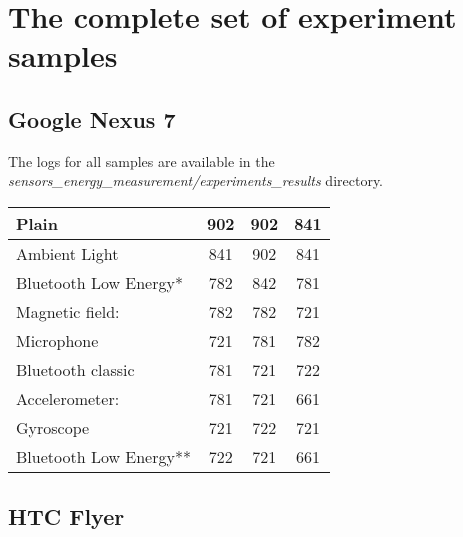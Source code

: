 \section{The complete set of experiment samples}
\subsection{Google Nexus 7}	

The logs for all samples are available in the \textit{sensors_energy_measurement/experiments_results} directory.

\begin{table}[H]
	\centering
    \begin{tabular}{| l | c | c | c |}
    \hline
    Plain                  & 902 & 902 & 841 \\ \hline
    Ambient Light          & 841 & 902 & 841\\ \hline
    Bluetooth Low Energy*  & 782 & 842 & 781 \\ \hline
    Magnetic field:        & 782 & 782 & 721\\ \hline
    Microphone             & 721 & 781 & 782 \\ \hline
    Bluetooth classic      & 781 & 721 & 722 \\ \hline
    Accelerometer:         & 781 & 721 & 661 \\ \hline
    Gyroscope              & 721 & 722 & 721 \\ \hline
    Bluetooth Low Energy** & 722 & 721 & 661 \\ \hline
    \end{tabular}
\end{table}

\subsection{HTC Flyer}	

